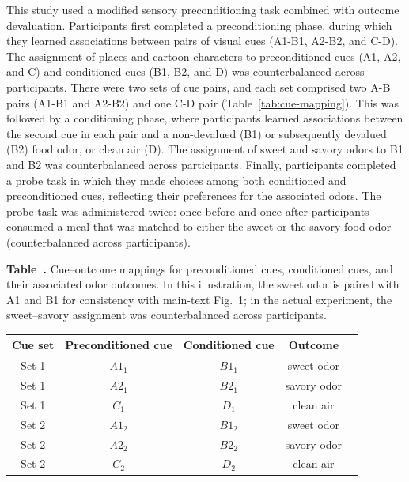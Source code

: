 \documentclass[12pt,letterpaper]{article}
\begin{document}
This study used a modified sensory preconditioning task combined with outcome devaluation. Participants first completed a preconditioning phase, during which they learned associations between pairs of visual cues (A1-B1, A2-B2, and C-D). The assignment of places and cartoon characters to preconditioned cues (A1, A2, and C) and conditioned cues (B1, B2, and D) was counterbalanced across participants. There were two sets of cue pairs, and each set comprised two A-B pairs (A1-B1 and A2-B2) and one C-D pair (Table~\ref{tab:cue-mapping}). This was followed by a conditioning phase, where participants learned associations between the second cue in each pair and a non-devalued (B1) or subsequently devalued (B2) food odor, or clean air (D). The assignment of sweet and savory odors to B1 and B2 was counterbalanced across participants. Finally, participants completed a probe task in which they made choices among both conditioned and preconditioned cues, reflecting their preferences for the associated odors. The probe task was administered twice: once before and once after participants consumed a meal that was matched to either the sweet or the savory food odor (counterbalanced across participants).


\par\bigskip\begingroup
{}


\par\noindent\textbf{Table~\thetable. }Cue–outcome mappings for preconditioned cues, conditioned cues, and their associated odor outcomes.
In this illustration, the sweet odor is paired with A1 and B1 for consistency with main-text Fig.~1;
in the actual experiment, the sweet–savory assignment was counterbalanced across participants.
\par

\label{tab:cue-mapping}
\small\setlength{\tabcolsep}{4pt}\begin{tabular}{ccccc}
\hline
\textbf{Cue set} & \textbf{Preconditioned cue} & \textbf{Conditioned cue} & \textbf{Outcome} \\
\hline
Set 1 & $A1_{1}$ & $B1_{1}$ & sweet odor \\
Set 1 & $A2_{1}$ & $B2_{1}$ & savory odor \\
Set 1 & $C_{1}$ & $D_{1}$ & clean air \\
Set 2 & $A1_{2}$ & $B1_{2}$ & sweet odor \\
Set 2 & $A2_{2}$ & $B2_{2}$ & savory odor \\
Set 2 & $C_{2}$ & $D_{2}$ & clean air \\
\hline
\end{tabular}
\end{document}
